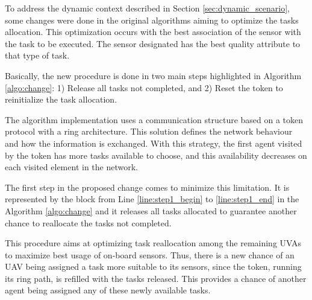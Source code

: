 
To address the dynamic context described in Section \ref{sec:dynamic_scenario}, some changes were done in the original algorithms aiming to optimize the tasks allocation. This optimization occurs with the best association of the sensor with the task to be executed. The sensor designated has the best quality attribute to that type of task. 

Basically, the new procedure is done in two main steps highlighted in Algorithm \ref{algo:change}: 1) Release all tasks not completed, and 2) Reset the token to reinitialize the task allocation.

The algorithm implementation uses a communication structure based on a token protocol with a ring architecture. This solution defines the network behaviour and how the information is exchanged. With this strategy, the first agent visited by the token has more tasks available to choose, and this availability decreases on each visited element in the network.

The first step in the proposed change comes to minimize this limitation. It is represented by the block from Line \ref{line:step1_begin} to \ref{line:step1_end} in the Algorithm \ref{algo:change} and it releases all tasks allocated to guarantee another chance to reallocate the tasks not completed.

This procedure aims at optimizing task reallocation among the remaining UVAs to maximize best usage of on-board sensors. Thus, there is a new chance of an UAV being assigned a task more suitable to its sensors, since the token, running its ring path, is refilled with the tasks released. This provides a chance of another agent being assigned any of these newly available tasks.


